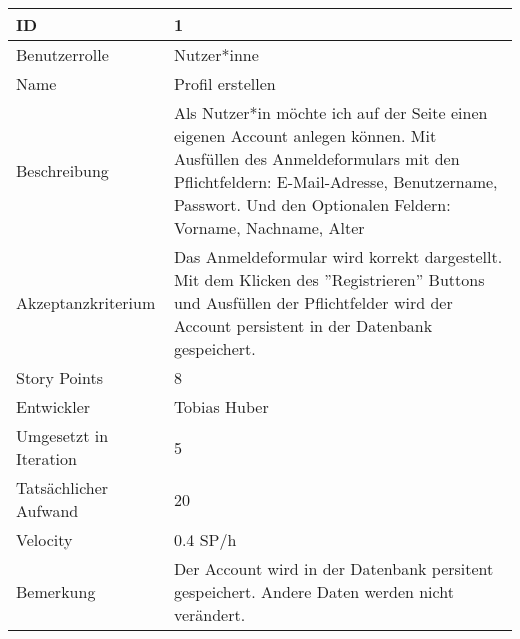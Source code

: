 \begin{tabularx}{\textwidth}{|p{}|X|}
		\hline
		ID & 1 \\
		\hline
		Benutzerrolle & Nutzer*inne \\
		\hline
		Name & Profil erstellen \\
		\hline
		Beschreibung & Als Nutzer*in möchte ich auf der Seite einen eigenen Account anlegen können. Mit Ausfüllen des Anmeldeformulars mit den Pflichtfeldern:
		E-Mail-Adresse,
		Benutzername,
		Passwort.
		Und den Optionalen Feldern:
		Vorname,
		Nachname,
		Alter \\
		\hline
		Akzeptanzkriterium & Das Anmeldeformular wird korrekt dargestellt. Mit dem Klicken des ''Registrieren'' Buttons und Ausfüllen der Pflichtfelder wird der Account persistent in der Datenbank gespeichert. \\
		\hline
		Story Points & 8 \\
		\hline
		Entwickler & Tobias Huber \\
		\hline
		Umgesetzt in Iteration & 5 \\
		\hline
		Tatsächlicher Aufwand & 20 \\
		\hline
		Velocity & 0.4 SP/h \\
		\hline
		Bemerkung &  Der Account wird in der Datenbank persitent gespeichert. Andere Daten werden nicht verändert.\\
		\hline
\end{tabularx}
\vspace{20pt}
